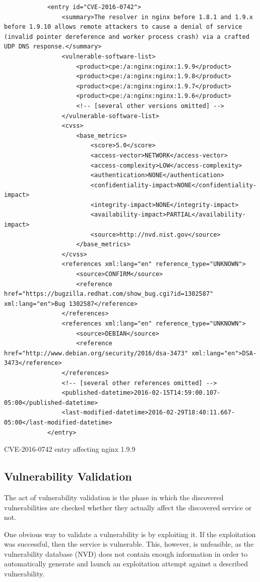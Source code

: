 \documentclass[a4paper,12pt]{article}
\begin{document}
	\begin{listing}[H]
		\begin{verbatim}
			<entry id="CVE-2016-0742">
				<summary>The resolver in nginx before 1.8.1 and 1.9.x before 1.9.10 allows remote attackers to cause a denial of service (invalid pointer dereference and worker process crash) via a crafted UDP DNS response.</summary>
				<vulnerable-software-list>
					<product>cpe:/a:nginx:nginx:1.9.9</product>
					<product>cpe:/a:nginx:nginx:1.9.8</product>
					<product>cpe:/a:nginx:nginx:1.9.7</product>
					<product>cpe:/a:nginx:nginx:1.9.6</product>
					<!-- [several other versions omitted] -->
				</vulnerable-software-list>
				<cvss>
					<base_metrics>
						<score>5.0</score>
						<access-vector>NETWORK</access-vector>
						<access-complexity>LOW</access-complexity>
						<authentication>NONE</authentication>
						<confidentiality-impact>NONE</confidentiality-impact>
						<integrity-impact>NONE</integrity-impact>
						<availability-impact>PARTIAL</availability-impact>
						<source>http://nvd.nist.gov</source>
					</base_metrics>
				</cvss>
				<references xml:lang="en" reference_type="UNKNOWN">
					<source>CONFIRM</source>
					<reference href="https://bugzilla.redhat.com/show_bug.cgi?id=1302587" xml:lang="en">Bug 1302587</reference>
				</references>
				<references xml:lang="en" reference_type="UNKNOWN">
					<source>DEBIAN</source>
					<reference href="http://www.debian.org/security/2016/dsa-3473" xml:lang="en">DSA-3473</reference>
				</references>
				<!-- [several other references omitted] -->
				<published-datetime>2016-02-15T14:59:00.107-05:00</published-datetime>
				<last-modified-datetime>2016-02-29T18:40:11.667-05:00</last-modified-datetime>
			</entry>
		\end{verbatim}
		\caption{CVE-2016-0742 entry affecting nginx 1.9.9}
		\label{nginxcve}
	\end{listing}
	
\subsection{Vulnerability Validation} \label{vulnvalid}
 

	The act of vulnerability validation is the phase in which the discovered vulnerabilities are checked whether they actually affect the discovered service or not.
	
	One obvious way to validate a vulnerability is by exploiting it. If the exploitation was successful, then the service is vulnerable. This, however, is unfeasible, as the vulnerability database (NVD) does not contain enough information in order to automatically generate and launch an exploitation attempt against a described vulnerability.
	
\end{document}
